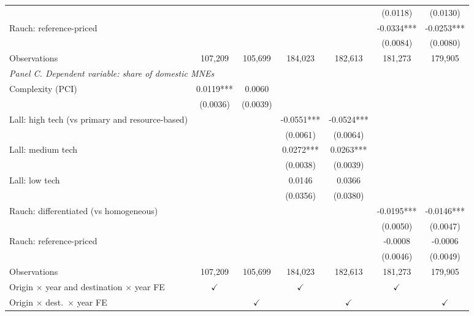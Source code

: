 \begin{tabular}{lcccccc}
 &  &  &  &  & (0.0118) & (0.0130) \\
Rauch: reference-priced &  &  &  &  & -0.0334*** & -0.0253*** \\
 &  &  &  &  & (0.0084) & (0.0080) \\
Observations & 107,209 & 105,699 & 184,023 & 182,613 & 181,273 & 179,905 \\
\midrule
\multicolumn{7}{l}{\textit{Panel C. Dependent variable: share of domestic MNEs}} \\
Complexity (PCI) & 0.0119*** & 0.0060 &  &  &  &  \\
 & (0.0036) & (0.0039) &  &  &  &  \\
Lall: high tech (vs primary and resource-based) &  &  & -0.0551*** & -0.0524*** &  &  \\
 &  &  & (0.0061) & (0.0064) &  &  \\
Lall: medium tech &  &  & 0.0272*** & 0.0263*** &  &  \\
 &  &  & (0.0038) & (0.0039) &  &  \\
Lall: low tech &  &  & 0.0146 & 0.0366 &  &  \\
 &  &  & (0.0356) & (0.0380) &  &  \\
Rauch: differentiated (vs homogeneous) &  &  &  &  & -0.0195*** & -0.0146*** \\
 &  &  &  &  & (0.0050) & (0.0047) \\
Rauch: reference-priced &  &  &  &  & -0.0008 & -0.0006 \\
 &  &  &  &  & (0.0046) & (0.0049) \\
Observations & 107,209 & 105,699 & 184,023 & 182,613 & 181,273 & 179,905 \\
\hline
Origin $\times$ year and destination $\times$ year FE & $\checkmark$ &  & $\checkmark$ &  & $\checkmark$ &  \\
Origin $\times$ dest.\ $\times$ year FE &  & $\checkmark$ &  & $\checkmark$ &  & $\checkmark$ \\
\hline
\end{tabular}
